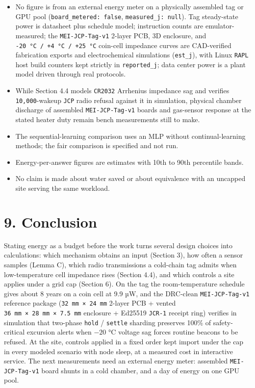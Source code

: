 \documentclass[10pt,letterpaper]{article}
\providecommand{\tightlist}{\setlength{\itemsep}{1pt}\setlength{\parskip}{0pt}}
\begin{document}
\begin{itemize}
\tightlist
\item
  No figure is from an external energy meter on a physically assembled
  tag or GPU pool (\texttt{board\_\allowbreak{}metered:\ false},
  \texttt{measured\_\allowbreak{}j:\ null}). Tag steady-state power is datasheet plus
  schedule model; instruction counts are emulator-measured; the
  \texttt{MEI-JCP-Tag-v1} 2-layer PCB, 3D enclosure, and
  \texttt{-\allowbreak{}20\ °C\ /\allowbreak{}\ +4\ °C\ /\allowbreak{}\ +25\ °C} coin-cell impedance curves are
  CAD-verified fabrication exports and electrochemical simulations
  (\texttt{est\_j}), with Linux \texttt{RAPL} host build counters kept
  strictly in \texttt{reported\_j}; data center power is a plant model
  driven through real protocols.
\item
  While Section 4.4 models \texttt{CR2032} Arrhenius impedance sag and
  verifies \texttt{10,000}-wakeup \texttt{JCP} radio refusal against it
  in simulation, physical chamber discharge of assembled
  \texttt{MEI-JCP-Tag-v1} boards and gas-sensor response at the stated
  heater duty remain bench measurements still to make.
\item
  The sequential-learning comparison uses an MLP without
  continual-learning methods; the fair comparison is specified and not
  run.
\item
  Energy-per-answer figures are estimates with 10th to 90th percentile
  bands.
\item
  No claim is made about water saved or about equivalence with an
  uncapped site serving the same workload.
\end{itemize}

\section{9. Conclusion}\label{conclusion}

Stating energy as a budget before the work turns several design choices
into calculations: which mechanism obtains an input (Section 3), how
often a sensor samples (Lemma C), which radio transmissions a cold-chain
tag admits when low-temperature cell impedance rises (Section 4.4), and
which controls a site applies under a grid cap (Section 6). On the tag
the room-temperature schedule gives about 8 years on a coin cell at 9.9
µW, and the DRC-clean \texttt{MEI-JCP-Tag-v1} reference package
(\texttt{32\ mm\ ×\ 24\ mm} 2-layer PCB + vented
\texttt{36\ mm\ ×\ 28\ mm\ ×\ 7.\allowbreak{}5\ mm} enclosure + Ed25519
\texttt{JCR-1} receipt ring) verifies in simulation that two-phase
\texttt{hold} / \texttt{settle} sharding preserves 100\% of
safety-critical excursion alerts when \(-20\text{ °C}\) voltage sag
forces routine beacons to be refused. At the site, controls applied in a
fixed order kept import under the cap in every modeled scenario with
node sleep, at a measured cost in interactive service. The next
measurements need an external energy meter: assembled
\texttt{MEI-JCP-Tag-v1} board shunts in a cold chamber, and a day of
energy on one GPU pool.
\end{document}
